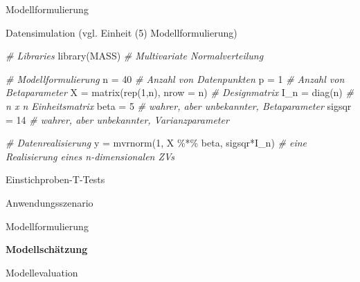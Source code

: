 \documentclass[
  8pt,
  ignorenonframetext,
]{beamer}
\newenvironment{Shaded}{\begin{snugshade}}{\end{snugshade}}
\newcommand{\AttributeTok}[1]{\textcolor[rgb]{0.77,0.63,0.00}{#1}}
\newcommand{\CommentTok}[1]{\textcolor[rgb]{0.56,0.35,0.01}{\textit{#1}}}
\newcommand{\DecValTok}[1]{\textcolor[rgb]{0.00,0.00,0.81}{#1}}
\newcommand{\FunctionTok}[1]{\textcolor[rgb]{0.00,0.00,0.00}{#1}}
\newcommand{\NormalTok}[1]{#1}
\newcommand{\OtherTok}[1]{\textcolor[rgb]{0.56,0.35,0.01}{#1}}
\newcommand{\SpecialCharTok}[1]{\textcolor[rgb]{0.00,0.00,0.00}{#1}}
\begin{document}
\begin{frame}[fragile]{Modellformulierung}
\protect\hypertarget{modellformulierung-1}{}
\small

Datensimulation (vgl. Einheit (5) Modellformulierung) \vspace{4mm}

\footnotesize
{}

\begin{Shaded}
\begin{Highlighting}[]
\CommentTok{\# Libraries}
\FunctionTok{library}\NormalTok{(MASS)                                }\CommentTok{\# Multivariate Normalverteilung}

\CommentTok{\# Modellformulierung}
\NormalTok{n      }\OtherTok{=} \DecValTok{40}                                  \CommentTok{\# Anzahl von Datenpunkten}
\NormalTok{p      }\OtherTok{=} \DecValTok{1}                                   \CommentTok{\# Anzahl von Betaparameter}
\NormalTok{X      }\OtherTok{=} \FunctionTok{matrix}\NormalTok{(}\FunctionTok{rep}\NormalTok{(}\DecValTok{1}\NormalTok{,n), }\AttributeTok{nrow =}\NormalTok{ n)          }\CommentTok{\# Designmatrix}
\NormalTok{I\_n    }\OtherTok{=} \FunctionTok{diag}\NormalTok{(n)                             }\CommentTok{\# n x n Einheitsmatrix}
\NormalTok{beta   }\OtherTok{=} \DecValTok{5}                                   \CommentTok{\# wahrer, aber unbekannter, Betaparameter}
\NormalTok{sigsqr }\OtherTok{=} \DecValTok{14}                                  \CommentTok{\# wahrer, aber unbekannter, Varianzparameter}

\CommentTok{\# Datenrealisierung}
\NormalTok{y      }\OtherTok{=} \FunctionTok{mvrnorm}\NormalTok{(}\DecValTok{1}\NormalTok{, X }\SpecialCharTok{\%*\%}\NormalTok{ beta, sigsqr}\SpecialCharTok{*}\NormalTok{I\_n)  }\CommentTok{\# eine Realisierung eines n{-}dimensionalen ZVs}
\end{Highlighting}
\end{Shaded}
\end{frame}

\begin{frame}{Einstichproben-T-Tests}
\protect\hypertarget{einstichproben-t-tests-3}{}
\large
{}
\vfill

Anwendungsszenario

Modellformulierung

\textbf{Modellschätzung}

Modellevaluation \vfill
\end{frame}
\end{document}
